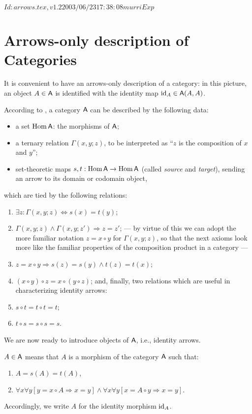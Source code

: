 \RCSID $Id: arrows.tex,v 1.2 2003/06/23 17:38:08 murri Exp $


\chapter{Arrows-only description of Categories}
\label{cha:arrows}

It is convenient to have an arrows-only description of a category: in
this picture, an object $A \in \mathsf{A}$ is identified with the identity map
$\operatorname{id}_A \in \mathsf{A}(A, A)$.

According to \cite{lawvere;1965}, a category $\mathsf{A}$ can be described by
the following data:
\begin{itemize}
\item a set $\operatorname{Hom}\mathsf{A}$: the morphisms of $\mathsf{A}$;
\item a ternary relation $\Gamma(x,y;z)$, to be interpreted as ``$z$ is
  the composition of $x$ and $y$'';
\item set-theoretic maps $s,t: \operatorname{Hom}\mathsf{A} \to \operatorname{Hom}\mathsf{A}$ (called \emph{source}
  and \emph{target}), sending an arrow to its domain or codomain
  object,
\end{itemize}
which are tied by the following relations:
\begin{enumerate}
\item $\exists z: \Gamma(x,y;z) \Leftrightarrow s(x) = t(y)$; \label{item:A1}
\item $\Gamma(x,y;z) \land \Gamma(x,y;z') \Rightarrow z = z'$;
--- by virtue of this we can adopt the more familiar notation $z = x\circ
y$ for $\Gamma(x,y; z)$, so that the next axioms look more like the
familiar properties of the composition product in a category ---
\item $z = x\circ y \Rightarrow s(z) = s(y) \land t(z) = t(x)$;
\item $(x\circ y) \circ z = x \circ (y \circ z)$;
and, finally, two relations which are useful in characterizing
identity arrows:
\item $s \circ t = t \circ t = t$;
\item $t \circ s = s \circ s = s$.
\end{enumerate}

We are now ready to introduce objects of $\mathsf{A}$, i.e., identity
arrows. 
\begin{definition}\label{dfn:object}
  $A\in \mathsf{A}$ means that $A$ is a morphism of the category $\mathsf{A}$
  such that:
  \begin{enumerate}
  \item $A = s(A) = t(A)$, \label{item:AO1}
  \item $\forall x\forall y[ y = x \circ A \Rightarrow x = y] \land \forall x\forall y [
    x = A \circ y \Rightarrow x = y]$. \label{item:AO2} 
  \end{enumerate}
\end{definition}
Accordingly, we write $A$ for the identity morphism $\operatorname{id}_A$.

